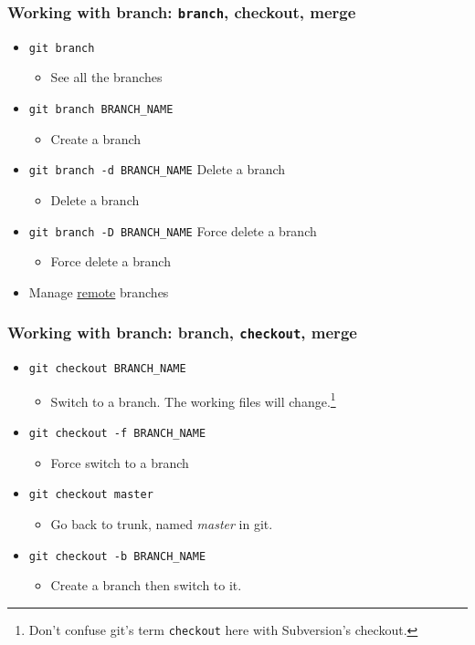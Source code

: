 \documentclass[11pt,ignorenonframetext,]{beamer}
\begin{document}
\begin{frame}[fragile]\frametitle{Working with \textbf{branch}:
\texttt{branch}, checkout, merge}

\begin{itemize}
\item
  \texttt{git branch} 
   \begin{itemize}
	   \item See all the branches
   \end{itemize}
\item
  \texttt{git branch BRANCH\_NAME} 
   \begin{itemize}
   \item
     Create a branch
   \end{itemize}
\item
  \texttt{git branch -d BRANCH\_NAME} Delete a branch
   \begin{itemize}
   \item
     Delete a branch
   \end{itemize}
\item
  \texttt{git branch -D BRANCH\_NAME} Force delete a branch
   \begin{itemize}
   \item
     Force delete a branch
   \end{itemize}
\item
   Manage \hyperlink{gitremote}{remote} branches
\end{itemize}
\end{frame}

\begin{frame}[fragile]\frametitle{Working with \textbf{branch}: branch,
\texttt{checkout}, merge}

\begin{itemize}
\item
  \texttt{git checkout BRANCH\_NAME} 
   \begin{itemize}
   \item
     Switch to a branch. The working files will change.\footnote{Don't
       confuse git's term \texttt{checkout} here with Subversion's
       checkout.}
   \end{itemize}
\item
  \texttt{git checkout -f BRANCH\_NAME} 
   \begin{itemize}
   \item
     Force switch to a branch
   \end{itemize}
\item
  \texttt{git checkout master}
   \begin{itemize}
   \item
     Go back to trunk, named \emph{master} in git.
   \end{itemize}
\item
  \texttt{git checkout -b BRANCH\_NAME} 
   \begin{itemize}
   \item
     Create a branch then switch to it.
   \end{itemize}
\end{itemize}
\end{frame}
\end{document}
